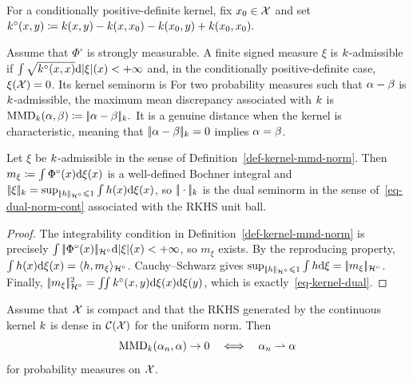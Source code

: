 For a conditionally positive-definite kernel, fix $x_0\in\mathcal{X}$ and set
\(k^\circ(x,y) \coloneqq k(x,y)-k(x,x_0)-k(x_0,y)+k(x_0,x_0).\)
\begin{defn}\label{def-kernel-mmd-norm}
Assume that $\Phi^\circ$ is strongly measurable. A finite signed measure $\xi$ is $k$-admissible if
$\int\sqrt{k^\circ(x,x)}\mathrm{d}|\xi|(x)<+\infty$ and, in the conditionally positive-definite case, $\xi(\mathcal{X})=0$. Its kernel seminorm is
For two probability measures such that $\alpha-\beta$ is $k$-admissible, the maximum mean discrepancy associated with $k$ is \(\operatorname{MMD}_{k}(\alpha,\beta)\coloneqq|\!| \alpha-\beta |\!|_{k}.\)
It is a genuine distance when the kernel is characteristic, meaning that $|\!| \alpha-\beta |\!|_{k}=0$ implies $\alpha=\beta$.
\end{defn}
\begin{prop}\label{prop-kernel-rkhs-dual}
Let $\xi$ be $k$-admissible in the sense of Definition~\ref{def-kernel-mmd-norm}. Then
$m_\xi\coloneqq\int\Phi^\circ(x)\mathrm{d}\xi(x)$ is a well-defined Bochner integral and
$|\!| \xi |\!|_{k}
=\sup_{|\!| h |\!|_{\mathcal{H}^\circ}\leqslant1}\int h(x)\mathrm{d}\xi(x)$,
so $|\!| \cdot |\!|_{k}$ is the dual seminorm in the sense of~\eqref{eq-dual-norm-cont} associated with the RKHS unit ball.
\end{prop}
\begin{proof}
The integrability condition in Definition~\ref{def-kernel-mmd-norm} is precisely $\int|\!| \Phi^\circ(x) |\!|_{\mathcal{H}^\circ}\mathrm{d}|\xi|(x)<+\infty$, so $m_\xi$ exists. By the reproducing property,
$\int h(x)\mathrm{d}\xi(x)
=\langle h,m_\xi\rangle_{\mathcal{H}^\circ}$.
Cauchy--Schwarz gives
$\sup_{|\!| h |\!|_{\mathcal{H}^\circ}\leqslant1}\int h\mathrm{d}\xi=|\!| m_\xi |\!|_{\mathcal{H}^\circ}$.
Finally,
$|\!| m_\xi |\!|_{\mathcal{H}^\circ}^2
=\iint k^\circ(x,y)\mathrm{d}\xi(x)\mathrm{d}\xi(y)$,
which is exactly~\eqref{eq-kernel-dual}.
\end{proof}
\begin{prop}\label{prop-mmd-metrization}
Assume that $\mathcal{X}$ is compact and that the RKHS generated by the continuous kernel $k$ is dense in $\mathcal{C}(\mathcal{X})$ for the uniform norm. Then
\[
\operatorname{MMD}_{k}(\alpha_n,\alpha)\to0
\quad\Longleftrightarrow\quad
\alpha_n\rightharpoonup\alpha
\]
for probability measures on $\mathcal{X}$.
\end{prop}
